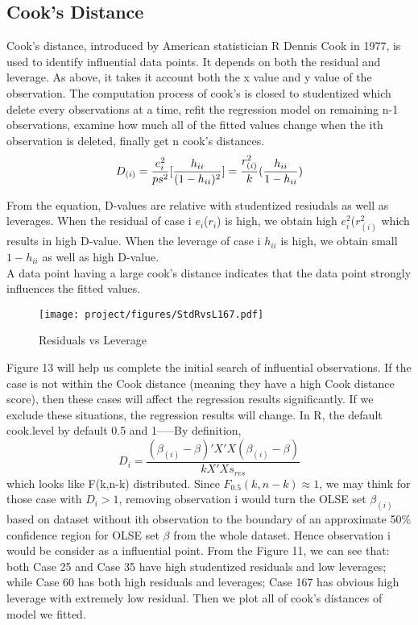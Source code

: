 \documentclass[a4paper]{article}
\begin{document}
\subsection{Cook's Distance}
Cook’s distance, introduced by American statistician R Dennis Cook in 1977, is used to identify influential data points. It depends on both the residual and leverage. As above, it takes it account both the x value and y value of the observation. The computation process of cook's is closed to studentized which delete every observations at a time, refit the regression model on remaining n-1 observations, examine how much all of the fitted values change when the ith observation is deleted, finally get n cook's distances. \\
\begin{equation*}
    D_{(i)}=\frac{e_i^2}{ps^2}\large{[}\frac{h_{ii}}{(1-h_{ii})^2}\large{]}=\frac{r_{(i)}^2}{k}(\frac{h_{ii}}{1-h_{ii}})
\end{equation*}

\noindent
From the equation, D-values are relative with studentized resiudals as well as leverages. When the residual of case i $e_i$($r_{i}$) is high, we obtain high $e_i^2$($r_{(i)}^2$ which results in high D-value. When the leverage of case i $h_{ii}$ is high, we obtain small $1-h_{ii}$ as well as high D-value.\\



\noindent
A data point having a large cook’s distance indicates that the data point strongly influences the fitted values.\\
\begin{figure}[!htb]
   \centering
    \texttt{[image: project/figures/StdRvsL167.pdf]}
    \caption{Residuals vs Leverage}
    \label{fig:my_label}
\end{figure}

\noindent
Figure 13 will help us complete the initial search of influential observations. If the case is not within the Cook distance (meaning they have a high Cook distance score), then these cases will affect the regression results significantly. If we exclude these situations, the regression results will change. In R, the default cook.level by default 0.5 and 1-----By definition, \[D_i = \frac{(\beta_{(i)}-\beta)'X'X(\beta_{(i)}-\beta)}{kX'Xs_{res}}\] which looks like F(k,n-k) distributed. Since $F_{0.5}(k,n-k) \approx 1$, we may think for those case with $D_i > 1$, removing observation i would turn the OLSE set $\beta_{(i)}$ based on dataset without ith observation to the boundary of an approximate 50\% confidence region for OLSE set $\beta$ from the whole dataset. Hence observation i would be consider as a influential point. From the Figure 11, we can see that: both Case 25 and Case 35 have high studentized residuals and low leverages; while Case 60 has both high residuals and leverages; Case 167 has obvious high leverage with extremely low residual. Then we plot all of cook's distances of model we fitted. \\
\end{document}
